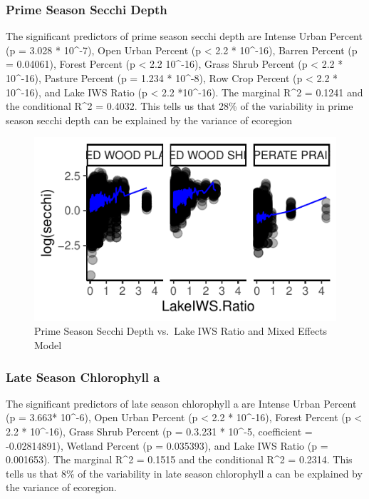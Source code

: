 \documentclass[12pt,]{article}
\begin{document}
\hypertarget{prime-season-secchi-depth}{%
\subsubsection{Prime Season Secchi
Depth}\label{prime-season-secchi-depth}}

The significant predictors of prime season secchi depth are Intense
Urban Percent (p = 3.028 * 10\^{}-7), Open Urban Percent (p \textless{}
2.2 * 10\^{}-16), Barren Percent (p = 0.04061), Forest Percent (p
\textless{} 2.2 10\^{}-16), Grass Shrub Percent (p \textless{} 2.2 *
10\^{}-16), Pasture Percent (p = 1.234 * 10\^{}-8), Row Crop Percent (p
\textless{} 2.2 * 10\^{}-16), and Lake IWS Ratio (p \textless{} 2.2
*10\^{}-16). The marginal R\^{}2 = 0.1241 and the conditional R\^{}2 =
0.4032. This tells us that 28\% of the variability in prime season
secchi depth can be explained by the variance of ecoregion

\begin{figure}
\centering
\includegraphics{Bollt_Greif_Raby_Roth_Project_Final_files/figure-latex/unnamed-chunk-20-1.pdf}
\caption{Prime Season Secchi Depth vs.~Lake IWS Ratio and Mixed Effects
Model}
\end{figure}

\hypertarget{late-season-chlorophyll-a}{%
\subsubsection{Late Season Chlorophyll
a}\label{late-season-chlorophyll-a}}

The significant predictors of late season chlorophyll a are Intense
Urban Percent (p = 3.663* 10\^{}-6), Open Urban Percent (p \textless{}
2.2 * 10\^{}-16), Forest Percent (p \textless{} 2.2 * 10\^{}-16), Grass
Shrub Percent (p = 0.3.231 * 10\^{}-5, coefficient = -0.02814891),
Wetland Percent (p = 0.035393), and Lake IWS Ratio (p = 0.001653). The
marginal R\^{}2 = 0.1515 and the conditional R\^{}2 = 0.2314. This tells
us that 8\% of the variability in late season chlorophyll a can be
explained by the variance of ecoregion.
\end{document}
